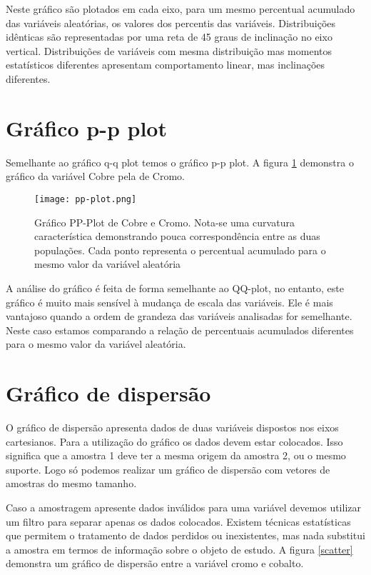 Neste gráfico são plotados em cada eixo, para um mesmo percentual acumulado das variáveis aleatórias, os valores dos percentis das variáveis. Distribuições idênticas são representadas por uma reta de 45 graus de inclinação no eixo vertical. Distribuições de variáveis com mesma distribuição mas momentos estatísticos diferentes apresentam comportamento linear, mas inclinações diferentes. 

\section{Gráfico p-p plot}

Semelhante ao gráfico q-q plot temos o gráfico p-p plot. A figura \ref{ppplot} demonstra o gráfico da variável Cobre pela de Cromo. 

\begin{figure}[H]
	\centering
	\texttt{[image: pp-plot.png]}	
	\caption{Gráfico PP-Plot de Cobre e Cromo. Nota-se uma curvatura característica demonstrando pouca correspondência entre as duas populações. Cada ponto representa o percentual acumulado para o mesmo valor da variável aleatória }
	\label{ppplot}
\end{figure} 

A análise do gráfico é feita de forma semelhante ao QQ-plot, no entanto, este gráfico é muito mais sensível à mudança de escala das variáveis. Ele é mais vantajoso quando a ordem de grandeza das variáveis analisadas for semelhante. Neste caso estamos comparando a relação de percentuais acumulados diferentes para o mesmo valor da variável aleatória. 

  \section{Gráfico de dispersão}
  
O gráfico de dispersão apresenta dados de duas variáveis dispostos nos eixos cartesianos. Para a utilização do gráfico os dados devem estar colocados. Isso significa que a amostra 1 deve ter a mesma origem da amostra 2, ou o mesmo suporte. Logo só podemos realizar um gráfico de dispersão com vetores de amostras do mesmo tamanho. 

Caso a amostragem apresente dados inválidos para uma variável devemos utilizar um filtro para separar apenas os dados colocados. Existem técnicas estatísticas que permitem o tratamento de dados perdidos ou inexistentes, mas nada substitui a amostra em termos de informação sobre o objeto de estudo. A figura \eqref{scatter} demonstra um gráfico de dispersão entre a variável cromo e cobalto.
  
